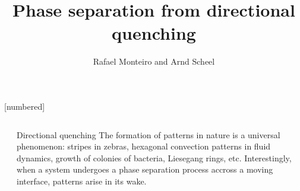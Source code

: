 \documentclass[final]{beamer}
\title{Phase separation from directional quenching} %
\author{Rafael Monteiro and Arnd Scheel} %
\institute{University of Minnesota - School of Mathematics} %
\newlength{\sepwid}
\newlength{\onecolwid}
\begin{document}
[numbered]{}

\setlength{\belowcaptionskip}{2ex} %
\setlength\belowdisplayshortskip{2ex} %

\begin{frame}[t] %

\begin{columns}[t] %

\begin{column}{\sepwid}\end{column} %

\begin{column}{\onecolwid} %


% 
% 

\begin{block}{Directional quenching}
The formation of patterns in nature is a universal phenomenon: stripes in zebras, hexagonal convection patterns in fluid dynamics, growth of colonies of bacteria, Liesegang rings,  etc. 
Interestingly, when a system undergoes a phase separation process accross a moving interface, patterns arise in its wake. 



\end{block}
\end{column}
\end{columns}
\end{frame}
\end{document}
